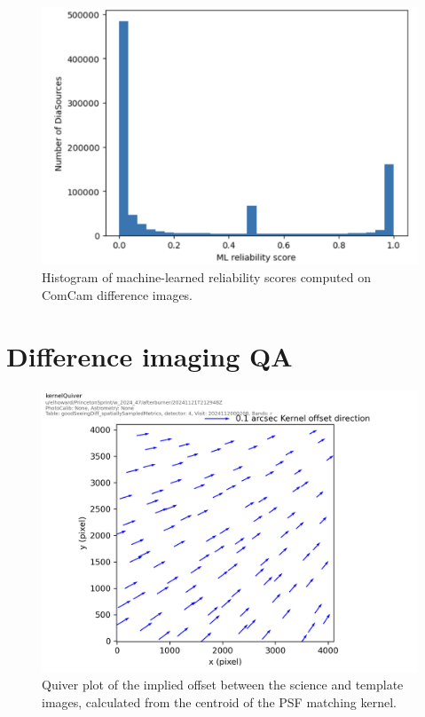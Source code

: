 \begin{figure}
\includegraphics[width=\textwidth]{dia/figures/reliability_histogram.png}
\caption{Histogram of machine-learned reliability scores computed on ComCam difference images. \label{fig:reliability_hist}}
\end{figure}

\section{Difference imaging QA}

\begin{figure}
\includegraphics[width=\textwidth]{dia/figures/DiffimKernelQuiverPlot.png}
\caption{Quiver plot of the implied offset between the science and template images, calculated from the centroid of the PSF matching kernel. \label{fig:diffim-quiver}}
\end{figure}

